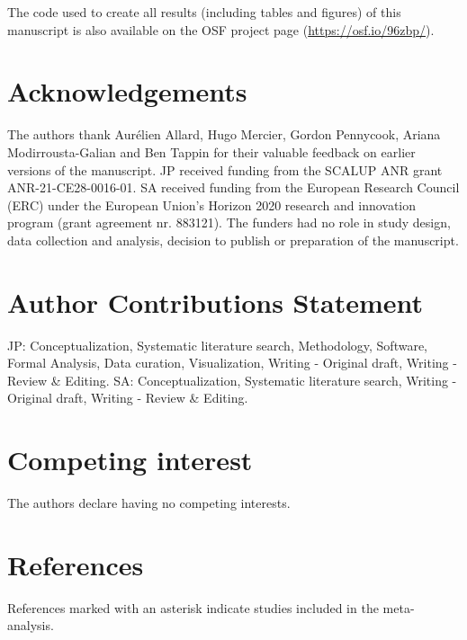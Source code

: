\documentclass[
  man]{apa6}
\begin{document}
The code used to create all results (including tables and figures) of this manuscript is also available on the OSF project page (\url{https://osf.io/96zbp/}).

\section{Acknowledgements}\label{acknowledgements}

The authors thank Aurélien Allard, Hugo Mercier, Gordon Pennycook, Ariana Modirrousta-Galian and Ben Tappin for their valuable feedback on earlier versions of the manuscript. JP received funding from the SCALUP ANR grant ANR-21-CE28-0016-01. SA received funding from the European Research Council (ERC) under the European Union's Horizon 2020 research and innovation program (grant agreement nr. 883121). The funders had no role in study design, data collection and analysis, decision to publish or preparation of the manuscript.

\section{Author Contributions Statement}\label{author-contributions-statement}

JP: Conceptualization, Systematic literature search, Methodology, Software, Formal Analysis, Data curation, Visualization, Writing - Original draft, Writing - Review \& Editing. SA: Conceptualization, Systematic literature search, Writing - Original draft, Writing - Review \& Editing.

\section{Competing interest}\label{competing-interest}

The authors declare having no competing interests.

\FloatBarrier

\newpage

\section{References}\label{references}

\begingroup
\setlength{\parindent}{-0.5in}
\setlength{\leftskip}{0.5in}

References marked with an asterisk indicate studies included in the meta-analysis.
\end{document}
